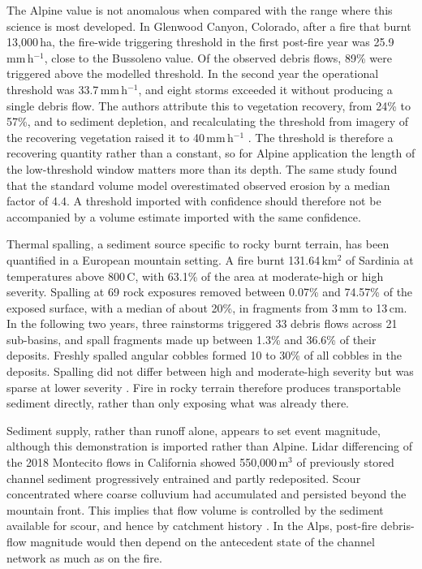 \documentclass[11pt,a4paper]{article}
\begin{document}
The Alpine value is not anomalous when compared with the range where this science is most developed. In Glenwood Canyon, Colorado, after a fire that burnt 13{,}000\,ha, the fire-wide triggering threshold in the first post-fire year was 25.9\,mm\,h$^{-1}$, close to the Bussoleno value. Of the observed debris flows, 89\% were triggered above the modelled threshold. In the second year the operational threshold was 33.7\,mm\,h$^{-1}$, and eight storms exceeded it without producing a single debris flow. The authors attribute this to vegetation recovery, from 24\% to 57\%, and to sediment depletion, and recalculating the threshold from imagery of the recovering vegetation raised it to 40\,mm\,h$^{-1}$ \citep{rengers_evaluating_2024}. The threshold is therefore a recovering quantity rather than a constant, so for Alpine application the length of the low-threshold window matters more than its depth. The same study found that the standard volume model overestimated observed erosion by a median factor of 4.4. A threshold imported with confidence should therefore not be accompanied by a volume estimate imported with the same confidence.

Thermal spalling, a sediment source specific to rocky burnt terrain, has been quantified in a European mountain setting. A fire burnt 131.64\,km$^2$ of Sardinia at temperatures above 800\,\degree{}C, with 63.1\% of the area at moderate-high or high severity. Spalling at 69 rock exposures removed between 0.07\% and 74.57\% of the exposed surface, with a median of about 20\%, in fragments from 3\,mm to 13\,cm. In the following two years, three rainstorms triggered 33 debris flows across 21 sub-basins, and spall fragments made up between 1.3\% and 36.6\% of their deposits. Freshly spalled angular cobbles formed 10 to 30\% of all cobbles in the deposits. Spalling did not differ between high and moderate-high severity but was sparse at lower severity \citep{pala_sediment_2025}. Fire in rocky terrain therefore produces transportable sediment directly, rather than only exposing what was already there.

Sediment supply, rather than runoff alone, appears to set event magnitude, although this demonstration is imported rather than Alpine. Lidar differencing of the 2018 Montecito flows in California showed 550{,}000\,m$^3$ of previously stored channel sediment progressively entrained and partly redeposited. Scour concentrated where coarse colluvium had accumulated and persisted beyond the mountain front. This implies that flow volume is controlled by the sediment available for scour, and hence by catchment history \citep{morell_sediment_2021}. In the Alps, post-fire debris-flow magnitude would then depend on the antecedent state of the channel network as much as on the fire.
\end{document}
